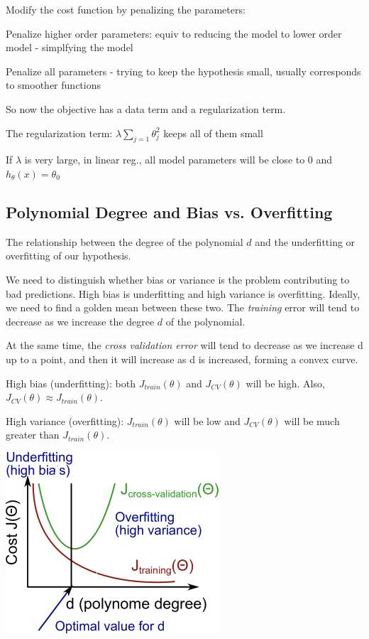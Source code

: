 Modify the cost function by penalizing the parameters:

Penalize higher order parameters: equiv to reducing the model to lower order model - simplfying the model

Penalize all parameters  - trying to keep the hypothesis small, usually corresponds to smoother functions

So now the objective has a data term and a regularization term.

The regularization term: $\lambda\sum_{j=1} \theta_j^2 $ keeps all of them small

If $\lambda $ is very large, in linear reg., all model parameters will be close to 0 and $h_\theta(x) = \theta_0$ 

\subsection{Polynomial Degree and Bias vs. Overfitting}

The relationship between the degree of the polynomial $d$ and the underfitting or overfitting of our hypothesis.

We need to distinguish whether bias or variance is the problem contributing to bad predictions. 
High bias is underfitting and high variance is overfitting. Ideally, we need to find a golden mean between these two.
The \emph{training} error will tend to decrease as we increase the degree $d$ of the polynomial.

At the same time, the \emph{cross validation error} will tend to decrease as we increase d up to a point, and then it will increase as d is increased, forming a convex curve.

High bias (underfitting): both $J_{train}(\theta)$ and $J_{CV}(\theta)$ will be high. Also, $J_{CV}(\theta)\approx J_{train}(\theta)$.

High variance (overfitting): $J_{train}(\theta)$ will be low and $J_{CV}(\theta)$ will be much greater than $J_{train}(\theta)$.

\includegraphics[width=0.9\columnwidth]{ml_figures/bias_variance.png}

